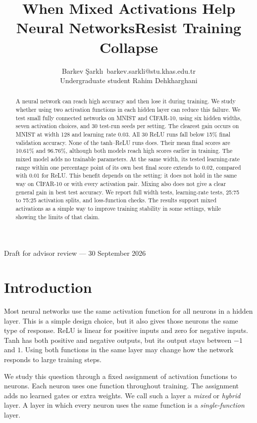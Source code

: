 \documentclass[10pt]{article}
\title{When Mixed Activations Help Neural Networks\newline Resist Training Collapse}
\author{\name Barkev \c{S}arkl\i\ \email barkev.sarkli@stu.khas.edu.tr\\
\addr Undergraduate student
\AND
\name Rahim Dehkharghani}
\begin{document}
\maketitle
\begin{center}\small Draft for advisor review --- 30 September 2026\end{center}

\begin{abstract}
A neural network can reach high accuracy and then lose it during training. We study whether using two activation functions in each hidden layer can reduce this failure. We test small fully connected networks on MNIST and CIFAR-10, using six hidden widths, seven activation choices, and 30 test-run seeds per setting. The clearest gain occurs on MNIST at width 128 and learning rate 0.03. All 30 ReLU runs fall below 15\% final validation accuracy. None of the tanh--ReLU runs does. Their mean final scores are 10.61\% and 96.76\%, although both models reach high scores earlier in training. The mixed model adds no trainable parameters. At the same width, its tested learning-rate range within one percentage point of its own best final score extends to 0.02, compared with 0.01 for ReLU. This benefit depends on the setting: it does not hold in the same way on CIFAR-10 or with every activation pair. Mixing also does not give a clear general gain in best test accuracy. We report full width tests, learning-rate tests, 25:75 to 75:25 activation splits, and loss-function checks. The results support mixed activations as a simple way to improve training stability in some settings, while showing the limits of that claim.
\end{abstract}

\section{Introduction}
Most neural networks use the same activation function for all neurons in a hidden layer. This is a simple design choice, but it also gives those neurons the same type of response. ReLU is linear for positive inputs and zero for negative inputs. Tanh has both positive and negative outputs, but its output stays between $-1$ and $1$. Using both functions in the same layer may change how the network responds to large training steps.

We study this question through a fixed assignment of activation functions to neurons. Each neuron uses one function throughout training. The assignment adds no learned gates or extra weights. We call such a layer a \emph{mixed} or \emph{hybrid} layer. A layer in which every neuron uses the same function is a \emph{single-function} layer.
\end{document}
